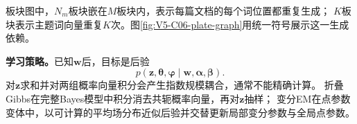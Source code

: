 \documentclass[UTF8,a4paper,11pt,openany]{ctexbook}
\begin{document}
\setcounter{page}{859}
\setcounter{chapter}{35}
\setcounter{section}{1}
\setcounter{figure}{1}
\pagestyle{headings}
板块图中，$N_m$板块嵌在$M$板块内，表示每篇文档的每个词位置都重复生成；
$K$板块表示主题词向量重复$K$次。图\ref{fig:V5-C06-plate-graph}用统一符号展示这一生成依赖。

\FloatBarrier
\textbf{学习策略。}已知$\boldsymbol w$后，目标是后验
\[
p(\boldsymbol z,\boldsymbol\theta,\boldsymbol\varphi
\mid\boldsymbol w,\boldsymbol\alpha,\boldsymbol\beta).
\]
对$\boldsymbol z$求和并对两组概率向量积分会产生指数规模耦合，通常不能精确计算。
折叠Gibbs在完整Bayes模型中积分消去共轭概率向量，再对$\boldsymbol z$抽样；
变分EM在点参数变体中，以可计算的平均场分布近似后验并交替更新局部变分参数与全局点参数。
\end{document}
